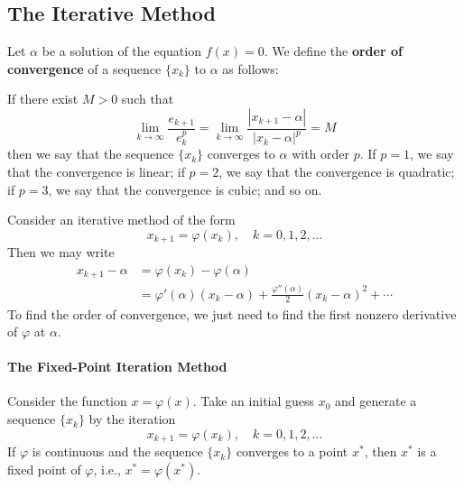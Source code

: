 \documentclass{matharticle}
\begin{document}
\subsection{The Iterative Method}
Let $\alpha$ be a solution of the equation $f(x) = 0$. We define the \textbf{order of convergence} of a sequence $\{x_k\}$ to $\alpha$ as follows:
\begin{definition}
	If there exist $M > 0$ such that
	\begin{equation}
		\lim_{k \to \infty} \frac{e_{k+1}}{e_k^p} = \lim_{k \to \infty} \frac{|x_{k+1} - \alpha|}{|x_k - \alpha|^p} = M
	\end{equation}
	then we say that the sequence $\{x_k\}$ converges to $\alpha$ with order $p$. If $p = 1$, we say that the convergence is linear; if $p = 2$, we say that the convergence is quadratic; if $p = 3$, we say that the convergence is cubic; and so on.
\end{definition}

Consider an iterative method of the form
\begin{equation}
	x_{k+1} = \varphi(x_k), \quad k = 0, 1, 2, \ldots
\end{equation}
Then we may write
\begin{equation}
	\begin{aligned}
		x_{k+1} - \alpha & = \varphi(x_k) - \varphi(\alpha)                                                          \\
		                 & = \varphi'(\alpha) (x_k - \alpha) + \frac{\varphi''(\alpha)}{2} (x_k - \alpha)^2 + \cdots
	\end{aligned}
\end{equation}
To find the order of convergence, we just need to find the first nonzero derivative of $\varphi$ at $\alpha$.

\paragraph{The Fixed-Point Iteration Method}
Consider the function $x = \varphi(x)$. Take an initial guess $x_0$ and generate a sequence $\{x_k\}$ by the iteration
\begin{equation}
	x_{k+1} = \varphi(x_k), \quad k = 0, 1, 2, \ldots
\end{equation}
If $\varphi$ is continuous and the sequence $\{x_k\}$ converges to a point $x^*$, then $x^*$ is a fixed point of $\varphi$, i.e., $x^* = \varphi(x^*)$.
\end{document}
